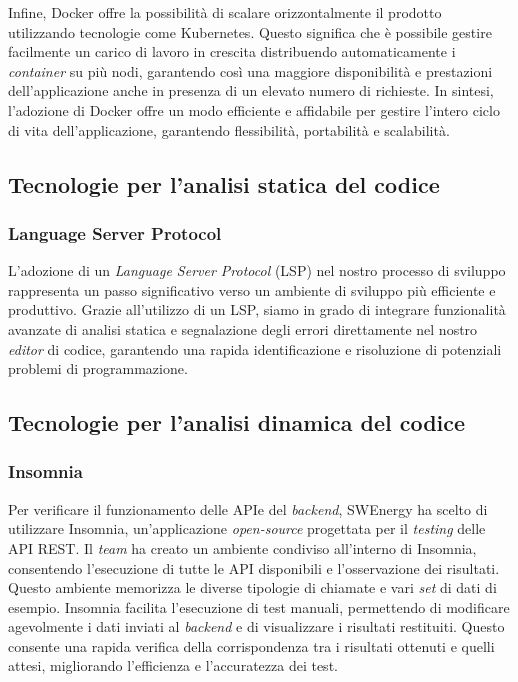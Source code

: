 Infine, Docker offre la possibilità di scalare orizzontalmente il prodotto
utilizzando tecnologie come Kubernetes. Questo significa che è possibile gestire
facilmente un carico di lavoro in crescita distribuendo automaticamente i
\textit{container} su più nodi, garantendo così una maggiore disponibilità e prestazioni
dell'applicazione anche in presenza di un elevato numero di richieste. In
sintesi, l'adozione di Docker offre un modo efficiente e affidabile per gestire l'intero ciclo di vita dell'applicazione, garantendo flessibilità, portabilità e scalabilità.




\subsection{Tecnologie per l'analisi statica del codice}

\subsubsection{Language Server Protocol}

L'adozione di un \textit{Language Server Protocol} (LSP) nel nostro processo di sviluppo
rappresenta un passo significativo verso un ambiente di sviluppo più efficiente
e produttivo. Grazie all'utilizzo di un LSP, siamo in grado di integrare
funzionalità avanzate di analisi statica e segnalazione degli errori
direttamente nel nostro \textit{editor} di codice, garantendo una rapida
identificazione e risoluzione di potenziali problemi di programmazione.

\subsection{Tecnologie per l'analisi dinamica del codice}

\subsubsection{Insomnia}
Per verificare il funzionamento delle API\g e del \textit{backend}, SWEnergy ha scelto di utilizzare Insomnia, un'applicazione \textit{open-source} progettata per il \textit{testing} delle API REST.
Il \textit{team} ha creato un ambiente condiviso all'interno di Insomnia, consentendo l'esecuzione di tutte le API disponibili e l'osservazione dei risultati.
Questo ambiente memorizza le diverse tipologie di chiamate e vari \textit{set} di dati di esempio.
Insomnia facilita l'esecuzione di test manuali, permettendo di modificare agevolmente i dati inviati al \textit{backend} e di visualizzare i risultati restituiti.
Questo consente una rapida verifica della corrispondenza tra i risultati ottenuti e quelli attesi, migliorando l'efficienza e l'accuratezza dei test.


